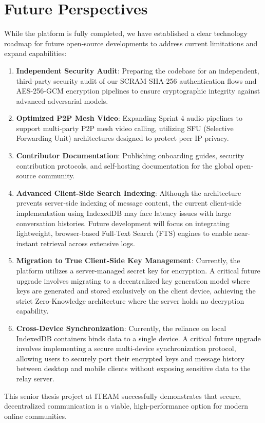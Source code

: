 \section*{Future Perspectives}
While the platform is fully completed, we have established a clear technology roadmap for future open-source developments to address current limitations and expand capabilities:
\begin{enumerate}
    \item \textbf{Independent Security Audit}: Preparing the codebase for an independent, third-party security audit of our SCRAM-SHA-256 authentication flows and AES-256-GCM encryption pipelines to ensure cryptographic integrity against advanced adversarial models.
    
    \item \textbf{Optimized P2P Mesh Video}: Expanding Sprint 4 audio pipelines to support multi-party P2P mesh video calling, utilizing SFU (Selective Forwarding Unit) architectures designed to protect peer IP privacy.
    
    \item \textbf{Contributor Documentation}: Publishing onboarding guides, security contribution protocols, and self-hosting documentation for the global open-source community.

    \item \textbf{Advanced Client-Side Search Indexing}: Although the architecture prevents server-side indexing of message content, the current client-side implementation using IndexedDB may face latency issues with large conversation histories. Future development will focus on integrating lightweight, browser-based Full-Text Search (FTS) engines to enable near-instant retrieval across extensive logs.

    \item \textbf{Migration to True Client-Side Key Management}: Currently, the platform utilizes a server-managed secret key for encryption. A critical future upgrade involves migrating to a decentralized key generation model where keys are generated and stored exclusively on the client device, achieving the strict Zero-Knowledge architecture where the server holds no decryption capability.

    \item \textbf{Cross-Device Synchronization}: Currently, the reliance on local IndexedDB containers binds data to a single device. A critical future upgrade involves implementing a secure multi-device synchronization protocol, allowing users to securely port their encrypted keys and message history between desktop and mobile clients without exposing sensitive data to the relay server.
\end{enumerate}
This senior thesis project at ITEAM successfully demonstrates that secure, decentralized communication is a viable, high-performance option for modern online communities.